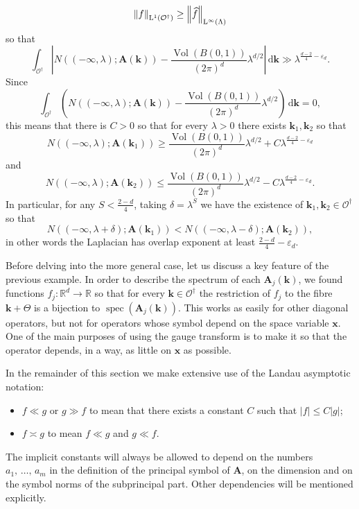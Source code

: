 \documentclass[AHL,Unicode,longabstracts,published]{cedram}
\DeclareMathOperator{\spec}{spec}
\newcommand{\de}{\, \mathrm{d}}
\newcommand{\RL}{\mathrm{L}}
\newcommand{\R}{\mathbb R}
\newcommand{\CO}{\mathcal{O}}
\newcommand{\BA}{\mathbf A}
\newcommand{\bx}{\mathbf x}
\newcommand{\bk}{\mathbf k}
\newcommand{\eps}{\varepsilon}
\newcommand{\abs}[1]{\left\lvert #1 \right\rvert}
\newcommand{\norm}[1]{\left\| #1 \right\|}
\let\oldhat\hat
\renewcommand*{\hat}[1]{\mathchoice{\widehat{#1}}{\widehat{#1}}{\oldhat{#1}}{\oldhat{#1}}}
\begin{document}
\begin{exem}
\begin{equation}
\norm{f}_{\RL^1(\CO^\dagger)} \ge \norm{\hat f}_{\RL^\infty(\Lambda)}
\end{equation}
so that
\begin{equation}
\int_{\CO^\dagger} \abs{N((- \infty, \lambda);\BA(\bk)) -
\frac{\operatorname{Vol}(B(0,1))}{(2\pi)^d} \lambda^{d/2}} \de \bk \gg
\lambda^{\frac{d-2}{4} - \eps_d}.
\end{equation}
Since
\begin{equation}
\int_{\CO^\dagger}\left(N((-\infty,\lambda);\BA(\bk)) -
\frac{\operatorname{Vol}(B(0,1))}{(2\pi)^d} \lambda^{d/2}\right) \de \bk = 0,
\end{equation}
this means that there is $C > 0$ so that for every $\lambda > 0$ there exists $\bk_1,\bk_2$ so that
\begin{equation}
N((-\infty,\lambda);\BA(\bk_1)) \ge
\frac{\operatorname{Vol}(B(0,1))}{(2\pi)^d} \lambda^{d/2} + C
\lambda^{\frac{d-2}{4} - \eps_d}
\end{equation}
and
\begin{equation}
N((-\infty,\lambda);\BA(\bk_2)) \le
\frac{\operatorname{Vol}(B(0,1))}{(2\pi)^d} \lambda^{d/2} - C
\lambda^{\frac{d-2}{4} - \eps_d}.
\end{equation}
In particular, for any $S < \frac{2-d}{4}$, taking $\delta = \lambda^{S}$ we have the existence of $\bk_1, \bk_2 \in \CO^\dagger$ so that
\begin{equation}
N((-\infty, \lambda + \delta);\BA(\bk_1)) < N((-\infty, \lambda -
\delta);\BA(\bk_2)),
\end{equation}
in other words the Laplacian has overlap exponent at least $\frac{2-d}{4} -
\eps_d$.
\end{exem}

Before delving into the more general case, let us discuss a key feature of the previous example. In order to describe the spectrum of each $\BA_j(\bk)$, we found functions $f_j : \R^d \to \R$ so that for every $\bk \in \CO^\dagger$ the restriction of $f_j$ to the fibre $\bk + \Theta$ is a bijection to $\spec(\BA_j(\bk))$. This works as easily for other diagonal operators, but not for operators whose symbol depend on the space variable $\bx$. One of the main purposes of using the gauge transform is to make it so that the operator depends, in a way, as little on $\bx$ as possible.

\begin{rema}
In the remainder of this section we make extensive use of the Landau asymptotic notation:
\begin{itemize}
\item $f \ll g$ or $g \gg f$ to mean that there exists a constant $C$ such that $\abs f \le C \abs g$;
\item $f \asymp g$ to mean $f \ll g$ and $g \ll f$.
\end{itemize}
The implicit constants will always be allowed to depend on the numbers $a_1,\,\dotsc,\,a_m$ in the definition of the principal symbol of $\BA$, on the dimension and on the symbol norms of the subprincipal part. Other dependencies will be mentioned explicitly.
\end{rema}
\end{document}
